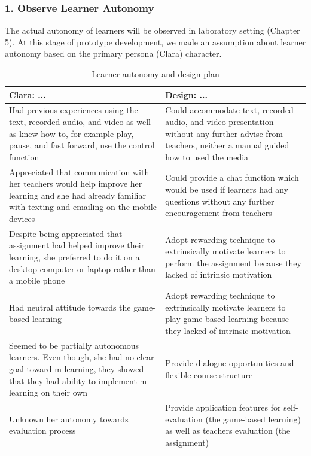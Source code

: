 \subsubsection{1. Observe Learner Autonomy}
The actual autonomy of learners will be observed in laboratory setting (Chapter 5). At this stage of prototype development, we made an assumption about learner autonomy based on the primary persona (Clara) character. 

\begin{table}[H]
\centering
\caption{Learner autonomy and design plan}
\begin{tabular}{ |p{6.25 cm}|p{6.25 cm}|} 
 \hline
 Clara: ... & Design: ...\\ 
\hline
Had previous experiences using the text, recorded audio, and video as well as knew how to, for example play, pause, and fast forward, use the control function & Could accommodate text, recorded audio, and video presentation without any further advise from teachers, neither a manual guided how to used the media  \\ 
\hline
Appreciated that communication with her teachers would help improve her learning and she had already familiar with texting and emailing on the mobile devices & Could provide a chat function which would be used if learners had any questions without any further encouragement from teachers  \\ 
 \hline
Despite being appreciated that assignment had helped improve their learning, 
she preferred to do it on a desktop computer or laptop rather than a mobile phone & Adopt rewarding technique to extrinsically motivate learners to perform the assignment because they lacked of intrinsic motivation  \\ 
\hline
Had neutral attitude towards the game-based learning & Adopt rewarding technique to extrinsically motivate learners to play game-based learning because they lacked of intrinsic motivation  \\ 
 \hline
Seemed to be partially autonomous learners. Even though, she had no clear goal toward m-learning, they showed that they had ability to implement m-learning on their own & Provide dialogue opportunities and flexible course structure \\ 
 \hline
Unknown her autonomy towards evaluation process & Provide application features for self-evaluation (the game-based learning) as well as teachers evaluation (the assignment)  \\ 
 \hline
\end{tabular}
\end{table}

